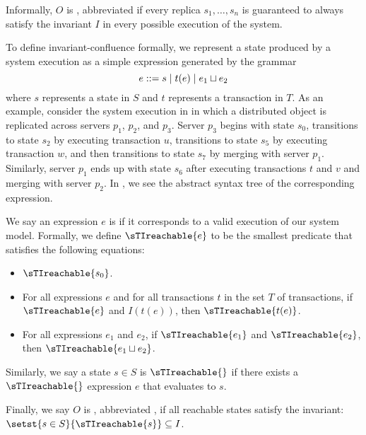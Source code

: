 Informally, $O$ is , abbreviated  if every replica $s_1, \ldots, s_n$
is guaranteed to always satisfy the invariant $I$ in every possible execution
of the system.

To define invariant-confluence formally, we represent a state produced by a
system execution as a simple expression generated by the grammar
\[
  e ::= s \mid t(e) \mid e_1 \sqcup e_2
\]
where $s$ represents a state in $S$ and $t$ represents a transaction in $T$. As
an example, consider the system execution in  in which
a distributed object is replicated across servers $p_1$, $p_2$, and $p_3$.
Server $p_3$ begins with state $s_0$, transitions to state $s_2$ by executing
transaction $u$, transitions to state $s_5$ by executing transaction $w$, and
then transitions to state $s_7$ by merging with server $p_1$. Similarly, server
$p_1$ ends up with state $s_6$ after executing transactions $t$ and $v$ and
merging with server $p_2$. In , we see the abstract syntax
tree of the corresponding expression.

{}

We say an expression $e$ is  if it corresponds to a
valid execution of our system model. Formally, we define $\sTIreachable{e}$ to
be the smallest predicate that satisfies the following equations:
\begin{itemize}
  \item
    $\sTIreachable{s_0}$.
  \item
    For all expressions $e$ and for all transactions $t$ in the set $T$ of
    transactions, if $\sTIreachable{e}$ and $I(t(e))$, then
    $\sTIreachable{t(e)}$.
  \item
    For all expressions $e_1$ and $e_2$, if $\sTIreachable{e_1}$ and
    $\sTIreachable{e_2}$, then $\sTIreachable{e_1 \join e_2}$.
\end{itemize}
Similarly, we say a state $s \in S$ is $\sTIreachable{}$ if there exists a
$\sTIreachable{}$ expression $e$ that evaluates to $s$.

Finally, we say $O$ is , abbreviated , if all reachable states
satisfy the invariant: $\setst{s \in S}{\sTIreachable{s}} \subseteq I$.
